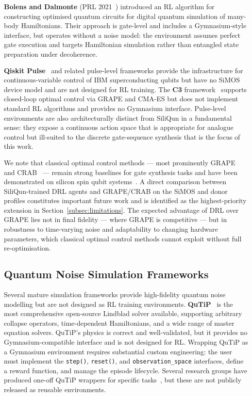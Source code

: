 \textbf{Bolens and Dalmonte} (PRL 2021~\cite{Bolens2021}) introduced an RL
algorithm for constructing optimised quantum circuits for digital quantum
simulation of many-body Hamiltonians. Their approach is gate-level and
includes a Gymnasium-style interface, but operates without a noise model:
the environment assumes perfect gate execution and targets Hamiltonian
simulation rather than entangled state preparation under decoherence.

\textbf{Qiskit Pulse}~\cite{Alexander2020} and related pulse-level
frameworks provide the infrastructure for continuous-variable control of IBM
superconducting qubits but have no SiMOS device model and are not designed
for RL training. The \textbf{C3} framework~\cite{Wittler2021} supports
closed-loop optimal control via GRAPE and CMA-ES but does not implement
standard RL algorithms and provides no Gymnasium interface. Pulse-level
environments are also architecturally distinct from SiliQun in a
fundamental sense: they expose a continuous action space that is appropriate
for analogue control but ill-suited to the discrete gate-sequence synthesis
that is the focus of this work.

We note that classical optimal control methods --- most prominently
GRAPE~\cite{Khaneja2005} and CRAB~\cite{Caneva2011} --- remain strong
baselines for gate synthesis tasks and have been demonstrated on silicon
spin qubit systems~\cite{Wittler2021,Sivak2022}. A direct comparison between
SiliQun-trained DRL agents and GRAPE/CRAB on the SiMOS and donor profiles
constitutes important future work and is identified as the highest-priority
extension in Section~\ref{subsec:limitations}. The expected advantage of
DRL over GRAPE lies not in final fidelity --- where GRAPE is competitive ---
but in robustness to time-varying noise and adaptability to changing hardware
parameters, which classical optimal control methods cannot exploit without
full re-optimisation.

\subsection{Quantum Noise Simulation Frameworks}
\label{sec:rw_noise_frameworks}

Several mature simulation frameworks provide high-fidelity quantum noise
modelling but are not designed as RL training environments.
\textbf{QuTiP}~\cite{Lambert2024} is the most comprehensive open-source
Lindblad solver available, supporting arbitrary collapse operators,
time-dependent Hamiltonians, and a wide range of master equation solvers.
QuTiP's physics is correct and well-validated, but it provides no
Gymnasium-compatible interface and is not designed for RL. Wrapping QuTiP
as a Gymnasium environment requires substantial custom engineering: the
user must implement the \texttt{step()}, \texttt{reset()}, and
\texttt{observation\_space} interfaces, define a reward function, and
manage the episode lifecycle. Several research groups have produced
one-off QuTiP wrappers for specific tasks~\cite{Moro2021,Niu2018}, but
these are not publicly released as reusable environments.

